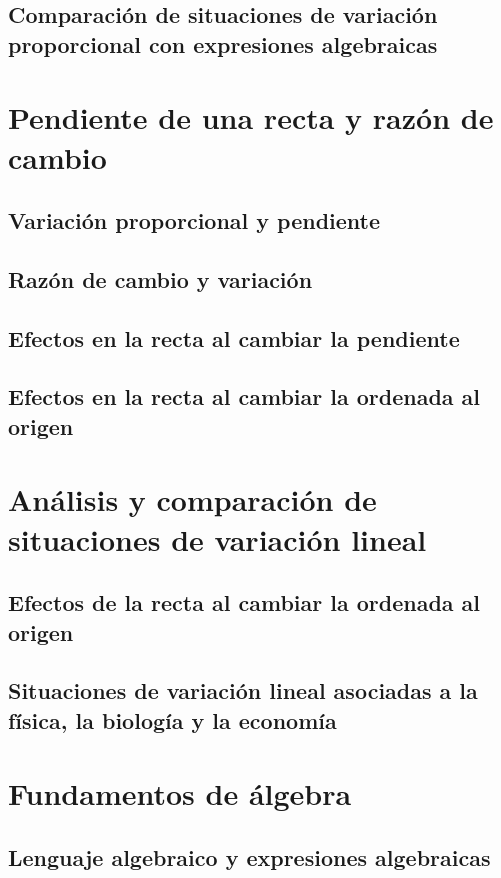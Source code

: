 \documentclass[12pt]{book}
\begin{document}
\begin{mainmatter}
    \subsection{Comparación de situaciones de variación proporcional con expresiones algebraicas}

    \section{Pendiente de una recta y razón de cambio}
    \subsection{Variación proporcional y pendiente}
    \subsection{Razón de cambio y variación}
    \subsection{Efectos en la recta al cambiar la pendiente}
    \subsection{Efectos en la recta al cambiar la ordenada al origen}

    \section{Análisis y comparación de situaciones de variación lineal}
    \subsection{Efectos de la recta al cambiar la ordenada al origen}
    \subsection{Situaciones de variación lineal asociadas a la física, la biología y la economía}


    \section{Fundamentos de álgebra}
    \subsection{Lenguaje algebraico y expresiones algebraicas}

\end{mainmatter}
\end{document}
